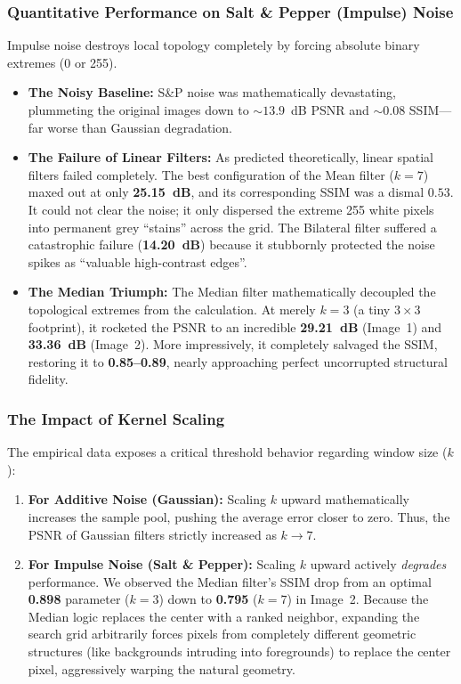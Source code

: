 \documentclass[a4paper,12pt]{article}
\begin{document}
\subsubsection{Quantitative Performance on Salt \& Pepper (Impulse) Noise}

Impulse noise destroys local topology completely by forcing absolute binary extremes (0 or 255).

\begin{itemize}
    \item \textbf{The Noisy Baseline:} S\&P noise was mathematically devastating, plummeting the original images down to $\sim 13.9$~dB PSNR and $\sim 0.08$ SSIM---far worse than Gaussian degradation.
    \item \textbf{The Failure of Linear Filters:} As predicted theoretically, linear spatial filters failed completely. The best configuration of the Mean filter ($k=7$) maxed out at only \textbf{25.15~dB}, and its corresponding SSIM was a dismal $0.53$. It could not clear the noise; it only dispersed the extreme 255 white pixels into permanent grey ``stains'' across the grid. The Bilateral filter suffered a catastrophic failure (\textbf{14.20~dB}) because it stubbornly protected the noise spikes as ``valuable high-contrast edges''.
    \item \textbf{The Median Triumph:} The Median filter mathematically decoupled the topological extremes from the calculation. At merely $k=3$ (a tiny $3 \times 3$ footprint), it rocketed the PSNR to an incredible \textbf{29.21~dB} (Image~1) and \textbf{33.36~dB} (Image~2). More impressively, it completely salvaged the SSIM, restoring it to \textbf{0.85--0.89}, nearly approaching perfect uncorrupted structural fidelity.
\end{itemize}

\subsubsection{The Impact of Kernel Scaling}

The empirical data exposes a critical threshold behavior regarding window size ($k$):
\begin{enumerate}
    \item \textbf{For Additive Noise (Gaussian):} Scaling $k$ upward mathematically increases the sample pool, pushing the average error closer to zero. Thus, the PSNR of Gaussian filters strictly increased as $k \to 7$.
    \item \textbf{For Impulse Noise (Salt \& Pepper):} Scaling $k$ upward actively \textit{degrades} performance. We observed the Median filter's SSIM drop from an optimal \textbf{0.898} parameter ($k=3$) down to \textbf{0.795} ($k=7$) in Image~2. Because the Median logic replaces the center with a ranked neighbor, expanding the search grid arbitrarily forces pixels from completely different geometric structures (like backgrounds intruding into foregrounds) to replace the center pixel, aggressively warping the natural geometry.
\end{enumerate}
\end{document}
